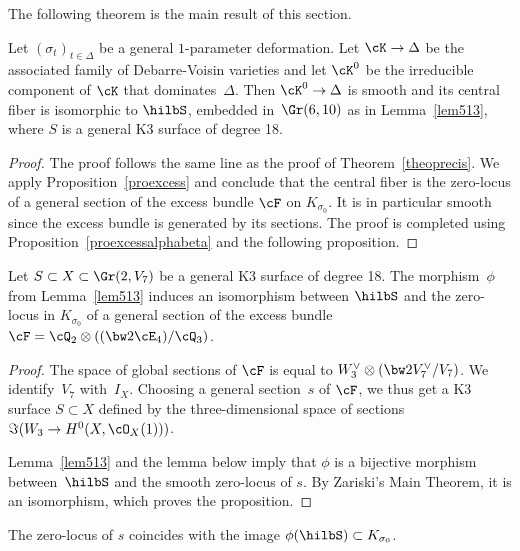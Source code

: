 The following theorem is the main result of this section.

\begin{theo}\label{theogenre10}
Let $(\sigma_t)_{t\in \Delta}$ be a general $1$-parameter deformation.
Let $\cK\to\Delta$ be the associated family of Debarre-Voisin varieties and let $\cK^0$ be the irreducible component of $\cK$ that dominates~$\Delta$.
Then $\cK^0\to \Delta$
is smooth and its central fiber is isomorphic to $\hilbS$, embedded in~$\Gr(6,10)$ as in Lemma~\ref{lem513}, where
$S$ is a general K3 surface of degree 18.
\end{theo}

\begin{proof} The proof follows the same line as the proof of Theorem~\ref{theoprecis}. We apply Proposition~\ref{proexcess} and conclude that
the central fiber is the zero-locus of a general section of the excess bundle
$\cF$
on $K_{\sigma_0}$.
It is in particular smooth since the excess bundle is generated by its sections.
The proof is completed using Proposition~\ref{proexcessalphabeta} and the following proposition.\end{proof}

\begin{prop} \label{propidentexcessgenre10}
Let $S\subset X\subset \Gr(2,V_7)$ be a general K3 surface of degree 18. The morphism~$\phi$ from Lemma~\ref{lem513} induces an isomorphism between
$ \hilbS $ and the zero-locus in $K_{\sigma_0}$ of a general section of
the excess bundle $\cF=\cQ_2\otimes((\bw2\cE_4)/\cQ_3)$.
\end{prop}

\begin{proof} The space of global sections of $\cF$ is equal to $W_3^\vee\otimes (\bw2V_7^\vee/V_7)$. We identify~$V_7$ with~$I_X$. Choosing a general section~$s$ of $\cF$, we thus get a K3 surface $S\subset X$ defined by the three-dimensional space of sections
$\Im (W_3\to H^0(X,\cO_X(1)))$.

{Lemma~\ref{lem513} and the lemma below imply that $\phi$ is a bijective morphism between~$\hilbS$ and the smooth zero-locus of $s$. By Zariski's Main Theorem, it is an isomorphism, which proves the proposition.}
\end{proof}

\begin{lemm}\label{lem520}
The
zero-locus of $s$ coincides with the image $\phi(\hilbS )\subset K_{\sigma_0}$.
\end{lemm}


